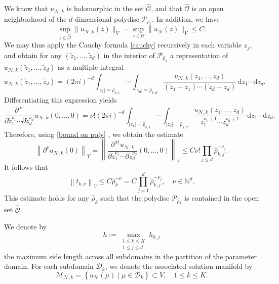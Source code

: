 \documentclass[12pt]{article}
\theoremstyle{remark}
\theoremstyle{definition}
\numberwithin{equation}{section}
\begin{document}
We know that $u_{\mathcal{N},k}$ is holomorphic in the set $\hat{\mathcal{O}}$, and that $\hat{\mathcal{O}}$ is an open neighborhood of the $d$-dimensional polydisc $\mathcal{P}_{\hat\rho_k}$. In addition, we have
\begin{equation}
    \sup_{z \in \hat {\mathcal{O}}} \|u_{\mathcal{N},k}(z)\|_V = \sup_{z \in \mathcal{O}} \|u_{\mathcal{N}}(z)\|_V  \leq C.
    \label{bound on poly}
\end{equation}
We may thus apply the Cauchy formula \eqref{cauchy} recursively in each variable $z_j$, and obtain for any $(\tilde{z}_1, \dots, \tilde{z}_d)$ in the interior of $\mathcal{P}_{\hat\rho_k}$ a representation of $u_{\mathcal{N},k}(\tilde{z}_1, \dots, \tilde{z}_d)$ as a multiple integral
\begin{equation}
u_{\mathcal{N},k}(\tilde{z}_1, \dots, \tilde{z}_d)
= (2\pi i)^{-d} \int_{|z_1| = \hat\rho_{k,1}} \cdots \int_{|z_d| = \hat\rho_{k,d}} 
\frac{u_{\mathcal{N},k}(z_1, \dots, z_d)}{(\tilde{z}_1 - z_1) \cdots (\tilde{z}_d - z_d)} \, \mathrm{d}z_1 \cdots \mathrm{d}z_d.
\end{equation}
Differentiating this expression yields
\begin{equation}
\frac{\partial^{|\nu|}}{\partial \tilde{z}_1^{\nu_1} \cdots \partial \tilde{z}_d^{\nu_d}} u_{\mathcal{N},k}(0, \dots, 0)
= \nu! (2\pi i)^{-d} \int_{|z_1| = \hat\rho_{k,1}} \cdots \int_{|z_d| = \hat\rho_{k,d}}
\frac{u_{\mathcal{N},k}(z_1, \dots, z_d)}{z_1^{\nu_1 + 1} \cdots z_d^{\nu_d + 1}} \, \mathrm{d}z_1 \cdots \mathrm{d}z_d.
\end{equation}
Therefore, using \eqref{bound on poly} , we obtain the estimate
\begin{equation}
\left\| \partial^{\nu} u_{\mathcal{N},k}(0) \right\|_V = \left\| \frac{\partial^{|\nu|} u_{\mathcal{N},k}}{\partial \tilde{z}_1^{\nu_1} \cdots \partial \tilde{z}_d^{\nu_d}}(0, \dots, 0) \right\|_V 
\leq C \nu! \prod_{j \leq d} \hat\rho_{k,j}^{-\nu_j}.
\end{equation}
It follows that
\begin{equation}
    \left\|t_{k,\nu}\right\|_V \leq C \hat\rho_k^{-\nu}=C \prod_{j=1}^d \hat\rho_{k,j}^{-\nu_j}, \quad \nu \in \mathbb{N}^d.
    \label{taylor bound}
\end{equation}
This estimate holds for any $\hat\rho_k$ such that the polydisc $\mathcal{P}_{\hat\rho_k}$ is contained in the open set $\hat{\mathcal{O}}$.

We denote by 
\begin{equation}
    h:=\max_{\substack{1 \leq k \leq K \\ 1 \leq j \leq d}}h_{k,j}
    \label{h}
\end{equation}
the maximum side length across all subdomains in the partition of the parameter domain. For each subdomain $\mathcal{D}_k$, we denote the associated solution manifold by
\begin{equation}
    \mathcal{M}_{\mathcal{N},k}=\left\{u_{\mathcal{N}}(\mu) \mid \mu \in \mathcal{D}_k\right\} \subset V, \quad 1 \leq k \leq K.
\end{equation}
\end{document}
